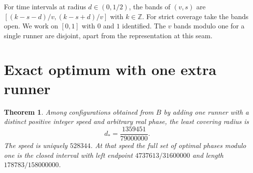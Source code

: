 \documentclass[11pt]{article}
\newtheorem{theorem}{Theorem}
\newcommand{\Z}{\mathbb{Z}}
\begin{document}
For time intervals at radius \(d\in(0,1/2)\), the bands of \((v,s)\)
are \([(k-s-d)/v,(k-s+d)/v]\) with \(k\in\Z\). For strict coverage
take the bands open. We work on \([0,1]\) with \(0\) and \(1\)
identified. The \(v\) bands modulo one for a single runner are
disjoint, apart from the representation at this seam.

\section{Exact optimum with one extra runner}

\begin{theorem}\label{thm:frozen}
Among configurations obtained from \(B\) by adding one runner with
a distinct positive integer speed and arbitrary real phase, the
least covering radius is
\[
 d_*=\frac{1359451}{79000000}.
\]
The speed is uniquely \(528344\). At that speed the full set of
optimal phases modulo one is the closed interval with left endpoint
\(4737613/31600000\) and length \(178783/158000000\).
\end{theorem}
\end{document}
